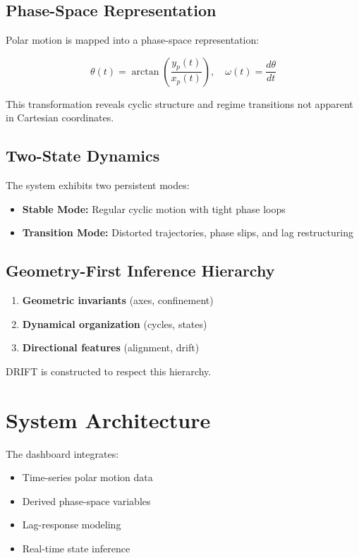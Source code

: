 \documentclass[11pt]{article}
\begin{document}
\subsection{Phase-Space Representation}

Polar motion is mapped into a phase-space representation:

\begin{equation}
\theta(t) = \arctan\left(\frac{y_p(t)}{x_p(t)}\right), \quad \omega(t) = \frac{d\theta}{dt}
\end{equation}

This transformation reveals cyclic structure and regime transitions not apparent in Cartesian coordinates.

\subsection{Two-State Dynamics}

The system exhibits two persistent modes:

\begin{itemize}
\item \textbf{Stable Mode:} Regular cyclic motion with tight phase loops
\item \textbf{Transition Mode:} Distorted trajectories, phase slips, and lag restructuring
\end{itemize}

\subsection{Geometry-First Inference Hierarchy}

\begin{enumerate}
\item \textbf{Geometric invariants} (axes, confinement)
\item \textbf{Dynamical organization} (cycles, states)
\item \textbf{Directional features} (alignment, drift)
\end{enumerate}

DRIFT is constructed to respect this hierarchy.

\section{System Architecture}

The dashboard integrates:

\begin{itemize}
\item Time-series polar motion data
\item Derived phase-space variables
\item Lag-response modeling
\item Real-time state inference
\end{itemize}
\end{document}
